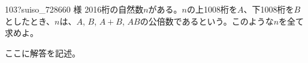 \begin{prob}{103}{\hosi ?}{suiso\_728660 様}
 2016桁の自然数$n$がある。$n$の上1008桁を$A$、下1008桁を$B$としたとき、$n$は、$A$, $B$, $A+B$, $AB$の公倍数であるという。このような$n$を全て求めよ。
\end{prob}
ここに解答を記述。
